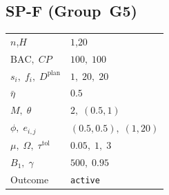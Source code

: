 \documentclass[12pt, a4paper]{article}
\newcommand{\BAC}{\mathrm{BAC}}
\begin{document}
\newpage

\subsection*{SP-F  (Group~G5)}
\begin{center}
\begin{tabular}{ll}
\toprule
$n$,\;$H$ & $1$,\;$20$ \\
$\BAC,\;CP$ & $100,\;100$ \\
$s_i,\;f_i,\;D^{\mathrm{plan}}$ & $1,\;20,\;20$ \\
$\bar\eta$ & $0.5$ \\
$M,\;\theta$ & $2,\;(0.5,1)$ \\
$\phi,\;e_{i,j}$ & $(0.5,0.5),\;(1,20)$ \\
$\mu,\;\Omega,\;\tau^{\mathrm{tol}}$ & $0.05,\;1,\;3$ \\
$B_1,\;\gamma$ & $500,\;0.95$ \\
Outcome & \texttt{active} \\
\bottomrule
\end{tabular}
\end{center}
\end{document}
